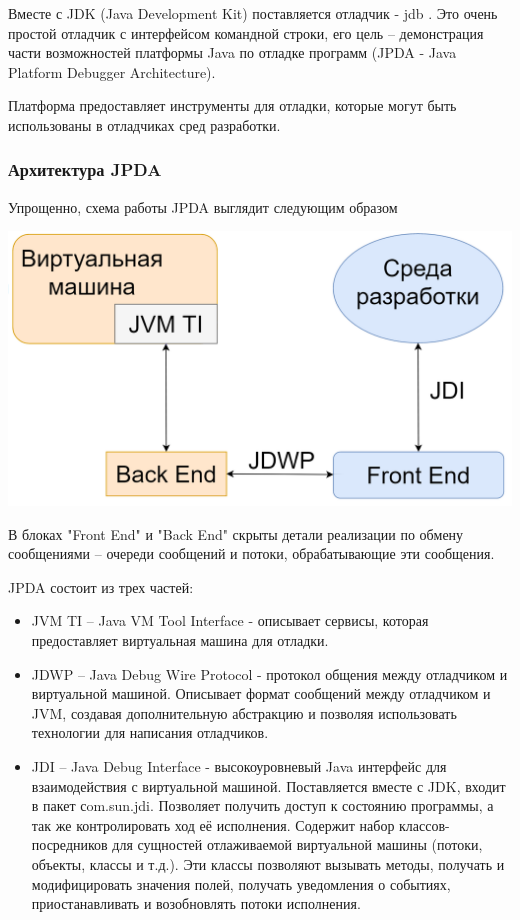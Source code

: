Вместе с JDK (Java Development Kit) поставляется отладчик - jdb \cite{debug:jdb}. Это очень простой отладчик с интерфейсом командной строки, его цель -- демонстрация части возможностей платформы Java по отладке программ (JPDA - Java Platform Debugger Architecture). 

Платформа предоставляет инструменты для отладки, которые могут быть использованы в отладчиках сред разработки.

\subsubsection{Архитектура JPDA}\label{jdpa}
Упрощенно, схема работы JPDA выглядит следующим образом

\vspace{1em}
\includegraphics[scale=0.4]{chapter1/img/jdpa.png}

В блоках "Front End" и "Back End" скрыты детали реализации по обмену сообщениями -- очереди сообщений и потоки, обрабатывающие эти сообщения.

JPDA состоит из трех частей:
\begin{itemize}
	\item JVM TI -- Java VM Tool Interface - описывает сервисы, которая предоставляет виртуальная машина для отладки. 
	\item JDWP -- Java Debug Wire Protocol - протокол общения между отладчиком и виртуальной машиной. Описывает формат сообщений между отладчиком и JVM, создавая дополнительную абстракцию и позволяя использовать технологии для написания отладчиков.
	\item JDI -- Java Debug Interface - высокоуровневый Java интерфейс для взаимодействия с виртуальной машиной. Поставляется вместе с JDK, входит в пакет сom.sun.jdi. Позволяет получить доступ к состоянию программы, а так же контролировать ход её исполнения. Содержит набор классов-посредников для сущностей отлаживаемой виртуальной машины (потоки, объекты, классы и т.д.). Эти классы позволяют вызывать методы, получать и модифицировать значения полей, получать уведомления о событиях, приостанавливать и возобновлять потоки исполнения.
\end{itemize}



